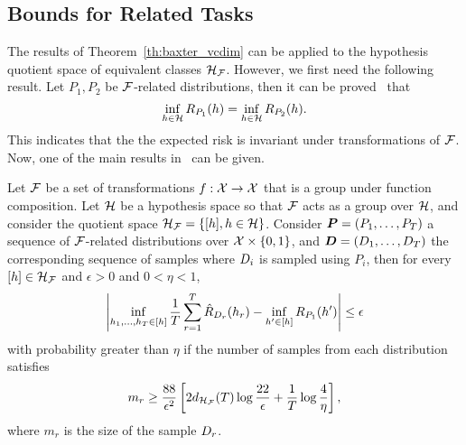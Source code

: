 \subsection{Bounds for Related Tasks}
The results of Theorem~\ref{th:baxter_vcdim} can be applied to the hypothesis quotient space of equivalent classes $\mathcal{H}_{\mathcal{F}}$. However, we first need the following result.
%
Let $P_1, P_2$ be $\mathcal{F}$-related distributions, then it can be proved~\cite[Lemma~2]{Ben-DavidB08} that
\begin{equation}
    \label{eq:ben-david_lemma2}
    \inf_{\hypf \in \hypspace} \risk_{P_1}(\hypf) = \inf_{\hypf \in \hypspace} \risk_{P_2}(\hypf).
\end{equation}
This indicates that the the expected risk is invariant under transformations of $\mathcal{F}$.
Now, one of the main results in~\citet[Theorem~2]{baxter2000model} can be given.
\begin{theorem}\label{th:ben-david_th2}
    Let $\mathcal{F}$ be a set of transformations $f: \mathcal{X} \to \mathcal{X}$ that is a group under function composition. Let $\mathcal{H}$ be a hypothesis space so that $\mathcal{F}$ acts as a group over $\mathcal{H}$, and consider the quotient space $\mathcal{H}_{\mathcal{F}} = \left\{\lbrack h\rbrack, h \in \mathcal{H}\right\}$.
    Consider $\bm{P} = (P_1, \ldots, P_T)$ a sequence of $\mathcal{F}$-related distributions over $\mathcal{X} \times \left\{0, 1\right\}$, and $\bm{D} = (D_1, \ldots, D_T)$ the corresponding sequence of samples  where $D_i$ is sampled using $P_i$, then for every $\lbrack h\rbrack \in \mathcal{H}_{\mathcal{F}}$ and $\epsilon> 0$ and $0 < \eta < 1$, 
    \begin{equation}
        \nonumber
        \left|\inf_{h_1, \ldots, h_T \in \lbrack h\rbrack} \frac{1}{T} \sum_{r=1}^T \hat{R}_{D_r}(h_r) - \inf_{h' \in \lbrack h\rbrack}R_{P_1}(h')\right|  \leq \epsilon
    \end{equation}
    with probability greater than $\eta$ if the number of samples from each distribution satisfies
    \begin{equation}
        \label{eq:ben-david_sample_inequality}
        m_r \geq  \frac{88}{\epsilon^2} \left[2 d_{\hypspace_\frelset}(\ntasks) \log \frac{22}{\epsilon} + \frac{1}{\ntasks}\log\frac{4}{\eta} \right],
    \end{equation}
    where $m_r$ is the size of the sample $D_r$.
\end{theorem}

